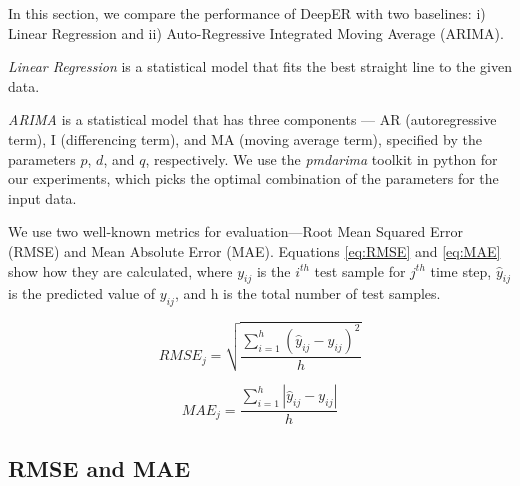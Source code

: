 

In this section, we compare the performance of DeepER with two baselines: i) Linear Regression and ii) Auto-Regressive Integrated Moving Average (ARIMA). 

\textit{Linear Regression} is a statistical model that fits the best straight line to the given data. 

\textit{ARIMA} is a statistical model that has three components --- AR (autoregressive term), I (differencing term), and MA (moving average term), specified by the parameters $p$, $d$, and $q$, respectively. We use the \textit{pmdarima} toolkit in python for our experiments, which picks the optimal combination of the parameters for the input data. 

We use two well-known metrics for evaluation---Root Mean Squared Error (RMSE) and Mean Absolute Error (MAE). Equations \ref{eq:RMSE} and \ref{eq:MAE} show how they are calculated, where $y_{ij}$ is the $i^{th}$ test sample for $j^{th}$ time step, $\hat{y}_{ij}$ is the predicted value of $y_{ij}$, and h is the total number of test samples. %

\begin{equation} 
	\label{eq:RMSE}
	RMSE_{j} = \sqrt{ \frac{\sum_{i=1}^{h} \left( \hat{y}_{ij} - y_{ij}\right)^{2}}{h}}
\end{equation} 

\begin{equation} 
	\label{eq:MAE}
	MAE_{j} = \frac{ \sum_{i=1}^{h} {|\hat{y}_{ij} - y_{ij}|}} {h}
\end{equation}
\vspace{-5mm}


\subsection{RMSE and MAE}






